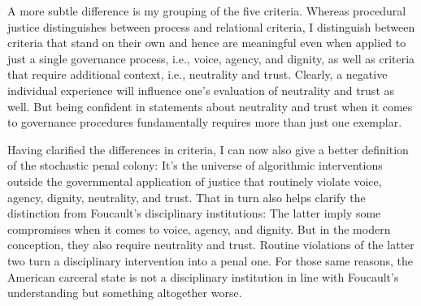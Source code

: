 A more subtle difference is my grouping of the five criteria. Whereas procedural
justice distinguishes between process and relational criteria, I distinguish
between criteria that stand on their own and hence are meaningful even when
applied to just a single governance process, i.e., voice, agency, and dignity,
as well as criteria that require additional context, i.e., neutrality and trust.
Clearly, a negative individual experience will influence one's evaluation of
neutrality and trust as well. But being confident in statements about neutrality
and trust when it comes to governance procedures fundamentally requires more
than just one exemplar.

Having clarified the differences in criteria, I can now also give a better
definition of the stochastic penal colony: It's the universe of algorithmic
interventions outside the governmental application of justice that routinely
violate voice, agency, dignity, neutrality, and trust. That in turn also helps
clarify the distinction from Foucault's disciplinary institutions: The latter
imply some compromises when it comes to voice, agency, and dignity. But in the
modern conception, they also require neutrality and trust. Routine violations of
the latter two turn a disciplinary intervention into a penal one. For those same
reasons, the American carceral state is not a disciplinary institution in line
with Foucault's understanding but something altogether worse.
